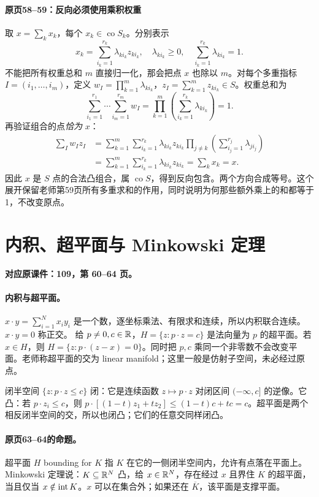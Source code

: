 \paragraph{原页58--59：反向必须使用乘积权重}
取 $x=\sum_k x_k$，每个 $x_k\in\operatorname{co}S_k$。分别表示
\[x_k=\sum_{i_k=1}^{r_k}\lambda_{k i_k}z_{k i_k},\quad \lambda_{k i_k}\ge0,\quad\sum_{i_k=1}^{r_k}\lambda_{k i_k}=1.\]
不能把所有权重总和 $m$ 直接归一化，那会把点 $x$ 也除以 $m$。对每个多重指标 $I=(i_1,\ldots,i_m)$，定义 $w_I=\prod_{k=1}^m\lambda_{k i_k}$，$z_I=\sum_{k=1}^m z_{k i_k}\in S$。权重总和为
\[\sum_{i_1=1}^{r_1}\cdots\sum_{i_m=1}^{r_m}w_I=\prod_{k=1}^m\left(\sum_{i_k=1}^{r_k}\lambda_{k i_k}\right)=1.\]
再验证组合的点\emph{恰为} $x$：
\begin{align*}
\sum_Iw_Iz_I
&=\sum_{k=1}^m\sum_{i_k=1}^{r_k}\lambda_{k i_k}z_{k i_k}
\prod_{j\ne k}\left(\sum_{i_j=1}^{r_j}\lambda_{j i_j}\right)\\
&=\sum_{k=1}^m\sum_{i_k=1}^{r_k}\lambda_{k i_k}z_{k i_k}
=\sum_kx_k=x.
\end{align*}
因此 $x$ 是 $S$ 点的合法凸组合，属 $\operatorname{co}S$，得到反向包含。两个方向合成等号。这个展开保留老师第59页所有多重求和的作用，同时说明为何那些额外乘上的和都等于1，不改变原点。


\clearpage\section{内积、超平面与 Minkowski 定理}\label{g:109:60}

\textbf{对应原课件：109，第 60--64 页。}


\paragraph{内积与超平面。}
$x\cdot y=\sum_{i=1}^N x_i y_i$ 是一个数，逐坐标乘法、有限求和连续，所以内积联合连续。$x\cdot y=0$ 称正交。
给 $p\ne0,c\in\mathbb{R}$，$H=\{z:p\cdot z=c\}$ 是法向量为 $p$ 的超平面。若 $x\in H$，则 $H=\{z:p\cdot(z-x)=0\}$。同时把 $p,c$ 乘同一个非零数不会改变平面。老师称超平面的交为 linear manifold；这里一般是仿射子空间，未必经过原点。

闭半空间 $\{z:p\cdot z\le c\}$ 闭：它是连续函数 $z\mapsto p\cdot z$ 对闭区间 $(-\infty,c]$ 的逆像。它凸：若 $p\cdot z_i\le c$，则 $p\cdot[(1-t)z_1+tz_2]\le(1-t)c+tc=c$。超平面是两个相反闭半空间的交，所以也闭凸；它们的任意交同样闭凸。
\paragraph{原页63--64的命题。}
超平面 $H$ bounding for $K$ 指 $K$ 在它的一侧闭半空间内，允许有点落在平面上。Minkowski 定理说：$K\subseteq\mathbb{R}^N$ 凸，给 $x\in\mathbb{R}^N$，存在经过 $x$ 且界住 $K$ 的超平面，当且仅当 $x\notin\operatorname{int} K$。$x$ 可以在集合外；如果还在 $\overline K$，该平面是支撑平面。


